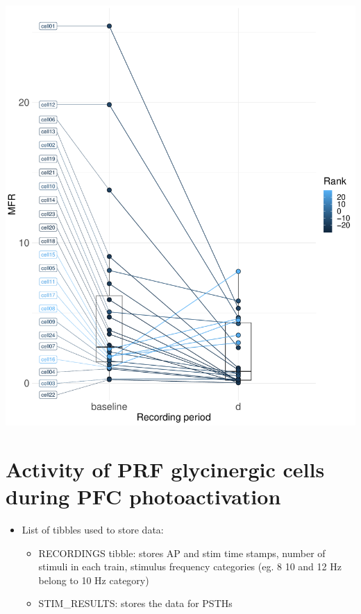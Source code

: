 \documentclass[12pt,]{article}
\providecommand{\tightlist}{%
  \setlength{\itemsep}{0pt}\setlength{\parskip}{0pt}}
\begin{document}
\includegraphics{GII_analysis_notebook_files/figure-latex/unnamed-chunk-17-1.pdf}

\hypertarget{activity-of-prf-glycinergic-cells-during-pfc-photoactivation}{%
\section{Activity of PRF glycinergic cells during PFC
photoactivation}\label{activity-of-prf-glycinergic-cells-during-pfc-photoactivation}}

\begin{itemize}
\tightlist
\item
  List of tibbles used to store data:

  \begin{itemize}
  \tightlist
  \item
    RECORDINGS tibble: stores AP and stim time stamps, number of stimuli
    in each train, stimulus frequency categories (eg. 8 10 and 12 Hz
    belong to 10 Hz category)
  \item
    STIM\_RESULTS: stores the data for PSTHs
  \end{itemize}
\end{itemize}
\end{document}
